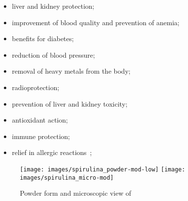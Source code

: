 \begin{itemize}
\item liver and kidney protection;
\item improvement of blood quality and prevention of anemia;
\item benefits for diabetes;
\item reduction of blood pressure;
\item removal of heavy metals from the body;
\item radioprotection;
\item prevention of liver and kidney toxicity;
\item antioxidant action;
\item immune protection;
\item relief in allergic reactions~\parencite{mohan_spirulina_2014};
\end{itemize}

\begin{figure}[H]
\centering
	\subcaptionbox*{\label{subfig:spirulina_powder}}%
		{\texttt{[image: images/spirulina\_powder-mod-low]}}%
\hfill
		{\texttt{[image: images/spirulina\_micro-mod]}}%
\caption{Powder form and microscopic view of }
\label{fig:spirulina_views}
\end{figure}

